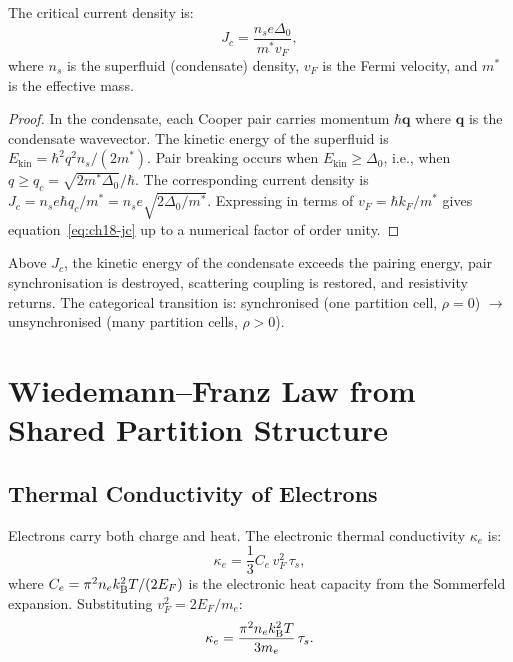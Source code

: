 \begin{theorem}
\label{thm:ch18-critcurr}
The critical current density is:
\begin{equation}
  J_c = \frac{n_s e \Delta_0}{m^* v_F},
  \label{eq:ch18-jc}
\end{equation}
where $n_s$ is the superfluid (condensate) density, $v_F$ is the Fermi
velocity, and $m^*$ is the effective mass.
\end{theorem}

\begin{proof}
In the condensate, each Cooper pair carries momentum $\hbar\mathbf{q}$
where $\mathbf{q}$ is the condensate wavevector.  The kinetic energy of
the superfluid is $E_{\mathrm{kin}} = \hbar^2 q^2 n_s/(2m^*)$.  Pair
breaking occurs when $E_{\mathrm{kin}} \geq \Delta_0$, i.e., when
$q \geq q_c = \sqrt{2m^*\Delta_0}/\hbar$.  The corresponding current
density is $J_c = n_s e \hbar q_c/m^* = n_s e\sqrt{2\Delta_0/m^*}$.
Expressing in terms of $v_F = \hbar k_F/m^*$ gives equation~\eqref{eq:ch18-jc}
up to a numerical factor of order unity.
\end{proof}

Above $J_c$, the kinetic energy of the condensate exceeds the pairing
energy, pair synchronisation is destroyed, scattering coupling is restored,
and resistivity returns.  The categorical transition is: synchronised
(one partition cell, $\rho = 0$) $\to$ unsynchronised (many partition
cells, $\rho > 0$).

\section{Wiedemann--Franz Law from Shared Partition Structure}
\label{sec:ch18-wiedemann}

\subsection{Thermal Conductivity of Electrons}

Electrons carry both charge and heat.  The electronic thermal conductivity
$\kappa_e$ is:
\begin{equation}
  \kappa_e = \frac{1}{3}C_e\,v_F^2\,\tau_s,
  \label{eq:ch18-kappae}
\end{equation}
where $C_e = \pi^2 n_e k_{\mathrm{B}}^2 T/(2E_F)$ is the electronic heat capacity
from the Sommerfeld expansion.  Substituting $v_F^2 = 2E_F/m_e$:
\begin{equation}
  \kappa_e = \frac{\pi^2 n_e k_{\mathrm{B}}^2 T}{3m_e}\,\tau_s.
  \label{eq:ch18-kappae2}
\end{equation}

